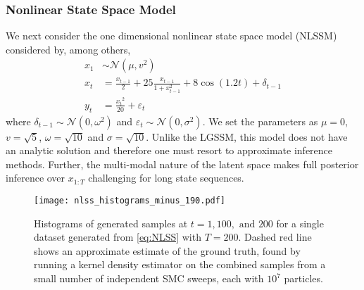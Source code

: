 \subsubsection{Nonlinear State Space Model}
\label{sec:nlss}

We next consider the one dimensional nonlinear state space model (NLSSM) considered by, among others, \citet{gordon1993novel,andrieuDH2010}
\begin{subequations}
	\label{eq:NLSS}
	\begin{align}
	x_1 & \sim \mathcal{N} \left(\mu, v^2\right) \label{eq:NLSSa}\\
	x_t & = \frac{x_{t-1}}{2} + 25 \frac{x_{t-1}}{1+x_{t-1}^2} + 8 \cos \left(1.2t\right) + \delta_{t-1} \label{eq:NLSSb} \\
	y_t & = \frac{{x_{t}}^2}{20} + \varepsilon_{t} \label{eq:NLSSc}
	\end{align}
\end{subequations}
where $\delta_{t-1} \sim \mathcal{N} \left(0, \omega^2\right)$ and $\varepsilon_{t} \sim \mathcal{N} \left(0, \sigma^2\right)$.  We set the parameters as $\mu = 0$, $v=\sqrt{5}$, $\omega = \sqrt{10}$ and $\sigma = \sqrt{10}$.  Unlike the LGSSM, this model does not have an analytic solution and therefore one must resort to approximate inference methods. 
Further, the multi-modal nature of the latent space makes full posterior inference over $x_{1:T}$ challenging for long state sequences. 

\begin{figure*}[t]
	\centering
	\texttt{[image: nlss\_histograms\_minus\_190.pdf]}
	\caption{Histograms of generated samples at $t=1, 100, \text{ and } 200$ for a single dataset generated from \eqref{eq:NLSS} with $T=200$.  Dashed red line shows an approximate estimate of the ground truth, found by running a kernel density estimator on the combined samples from a small number of independent SMC sweeps, each with $10^7$ particles. \label{fig:nlssHists}}
\end{figure*}

